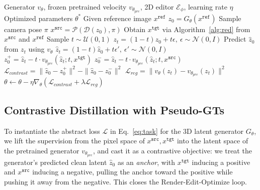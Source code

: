 \documentclass[runningheads]{llncs}
\begin{document}
\begin{algorithm}[t]
    \caption{Closed-loop Optimization via Dynamic Pseudo-GTs}
    \label{alg:oreo}
    \begin{algorithmic}[1]
    \Require Generator $v_\theta$, frozen pretrained velocity $v_{\theta_{pre}}$, 2D editor $\mathcal{E}_\phi$, learning rate $\eta$
    \Ensure Optimized parameters $\theta^*$
        \State Given reference image $x^{\texttt{ref}}$
        \State $z_0 = G_\theta(x^{\texttt{ref}})$ 
        \State Sample camera pose $\pi$
        \State $x^{\texttt{src}} = \mathcal{P}(\mathcal{D}(z_0), \pi)$ 
        \State Obtain $x^{\texttt{tgt}}$ via Algorithm~\ref{alg:red} from $x^{\texttt{src}}$ and $x^{\texttt{ref}}$ 
        \State Sample $t \sim \mathcal{U}(0,1)$
        \State $z_t = (1-t)z_0 + t\epsilon,\ \epsilon \sim \mathcal{N}(0,I)$ 
        \State Predict $\hat{z}_0$ from $z_t$ using $v_\theta$ 
        \State $\hat{z}_t = (1-t)\hat{z}_0 + t\epsilon',\ \epsilon' \sim \mathcal{N}(0,I)$ 
        \State $z_0^{+} = \hat{z}_t - t \cdot v_{\theta_{pre}}(\hat{z}_t; t, x^{\texttt{tgt}})$ 
        \State $z_0^{-} = \hat{z}_t - t \cdot v_{\theta_{pre}}(\hat{z}_t; t, x^{\texttt{src}})$ 
        \State $\mathcal{L}_{contrast} = \| \hat{z}_0 - z_0^{+} \|^2 - \| \hat{z}_0 - z_0^{-} \|^2$ 
        \State $\mathcal{L}_{reg} = \| v_\theta(z_t) - v_{\theta_{pre}}(z_t) \|^2$ 
        \State $\theta \leftarrow \theta - \eta \nabla_\theta (\mathcal{L}_{contrast} + \lambda \mathcal{L}_{reg})$ 
    \EndWhile
    \end{algorithmic}
    \end{algorithm}
    


\subsection{Contrastive Distillation with Pseudo-GTs}
\label{sec:optimization}


To instantiate the abstract loss $\mathcal{L}$ in Eq.~\ref{eq:task} for the 3D latent generator $G_\theta$, we lift the supervision from the pixel space of $x^{\texttt{src}}, x^{\texttt{tgt}}$ into the latent space of the pretrained generator $v_{\theta_{pre}}$, and cast it as a contrastive objective: we treat the generator's predicted clean latent $\hat{z}_0$ as an \emph{anchor}, with $x^{\texttt{tgt}}$ inducing a positive and $x^{\texttt{src}}$ inducing a negative, pulling the anchor toward the positive while pushing it away from the negative. This closes the Render-Edit-Optimize loop.
\end{document}

